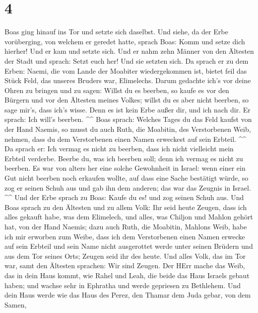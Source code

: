 \hypertarget{section-3}{%
\section{4}\label{section-3}}

 Boas ging hinauf ins Tor und setzte sich daselbst. Und
siehe, da der Erbe vorüberging, von welchem er geredet hatte, sprach
Boas: Komm und setze dich hierher! Und er kam und setzte sich.
 Und er nahm zehn Männer von den Ältesten der Stadt und
sprach: Setzt euch her! Und sie setzten sich.  Da sprach
er zu dem Erben: Naemi, die vom Lande der Moabiter wiedergekommen ist,
bietet feil das Stück Feld, das unseres Bruders war, Elimelechs.
 Darum gedachte ich's vor deine Ohren zu bringen und zu
sagen: Willst du es beerben, so kaufe es vor den Bürgern und vor den
Ältesten meines Volkes; willst du es aber nicht beerben, so sage mir's,
dass ich's wisse. Denn es ist kein Erbe außer dir, und ich nach dir. Er
sprach: Ich will's beerben. \^{}\^{}  Boas sprach: Welches
Tages du das Feld kaufst von der Hand Naemis, so musst du auch Ruth, die
Moabitin, des Verstorbenen Weib, nehmen, dass du dem Verstorbenen einen
Namen erweckest auf sein Erbteil. \^{}\^{}  Da sprach er:
Ich vermag es nicht zu beerben, dass ich nicht vielleicht mein Erbteil
verderbe. Beerbe du, was ich beerben soll; denn ich vermag es nicht zu
beerben.  Es war von alters her eine solche Gewohnheit in
Israel: wenn einer ein Gut nicht beerben noch erkaufen wollte, auf dass
eine Sache bestätigt würde, so zog er seinen Schuh aus und gab ihn dem
anderen; das war das Zeugnis in Israel. \^{}\^{}  Und der
Erbe sprach zu Boas: Kaufe du es! und zog seinen Schuh aus.
 Und Boas sprach zu den Ältesten und zu allem Volk: Ihr
seid heute Zeugen, dass ich alles gekauft habe, was dem Elimelech, und
alles, was Chiljon und Mahlon gehört hat, von der Hand Naemis;
 dazu auch Ruth, die Moabitin, Mahlons Weib, habe ich mir
erworben zum Weibe, dass ich dem Verstorbenen einen Namen erwecke auf
sein Erbteil und sein Name nicht ausgerottet werde unter seinen Brüdern
und aus dem Tor seines Orts; Zeugen seid ihr des heute. 
Und alles Volk, das im Tor war, samt den Ältesten sprachen: Wir sind
Zeugen. Der HErr mache das Weib, das in dein Haus kommt, wie Rahel und
Leah, die beide das Haus Israels gebaut haben; und wachse sehr in
Ephratha und werde gepriesen zu Bethlehem.  Und dein Haus
werde wie das Haus des Perez, den Thamar dem Juda gebar, von dem Samen,
